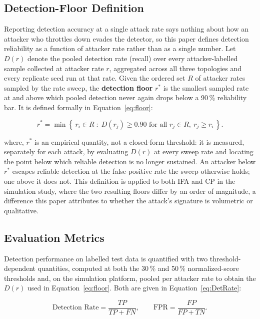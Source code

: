 \subsection{Detection-Floor Definition}
\label{sec:floor-def}

Reporting detection accuracy at a single attack rate says nothing about how an attacker who throttles down evades the detector, so this paper defines detection reliability as a function of attacker rate rather than as a single number. Let $D(r)$ denote the pooled detection rate (recall) over every attacker-labelled sample collected at attacker rate $r$, aggregated across all three topologies and every replicate seed run at that rate. Given the ordered set $R$ of attacker rates sampled by the rate sweep, the \textbf{detection floor} $r^{*}$ is the smallest sampled rate at and above which pooled detection never again drops below a 90\,\% reliability bar. It is defined formally in Equation~\eqref{eq:floor}:

\begin{equation}
\label{eq:floor}
r^{*} = \min\left\{\, r_i \in R \;:\; D(r_j) \ge 0.90 \text{ for all } r_j \in R,\ r_j \ge r_i \,\right\}.
\end{equation}

where, $r^{*}$ is an empirical quantity, not a closed-form threshold: it is measured, separately for each attack, by evaluating $D(r)$ at every sweep rate and locating the point below which reliable detection is no longer sustained. An attacker below $r^{*}$ escapes reliable detection at the false-positive rate the sweep otherwise holds; one above it does not. This definition is applied to both IFA and CP in the simulation study, where the two resulting floors differ by an order of magnitude, a difference this paper attributes to whether the attack's signature is volumetric or qualitative.

\subsection{Evaluation Metrics}

Detection performance on labelled test data is quantified with two threshold-dependent quantities, computed at both the 30\,\% and 50\,\% normalized-score thresholds and, on the simulation platform, pooled per attacker rate to obtain the $D(r)$ used in Equation~\eqref{eq:floor}. Both are given in Equation~\eqref{eq:DetRate}:

\begin{equation}
\label{eq:DetRate}
\text{Detection Rate} = \frac{TP}{TP + FN}, \qquad
\text{FPR} = \frac{FP}{FP + TN}.
\end{equation}

